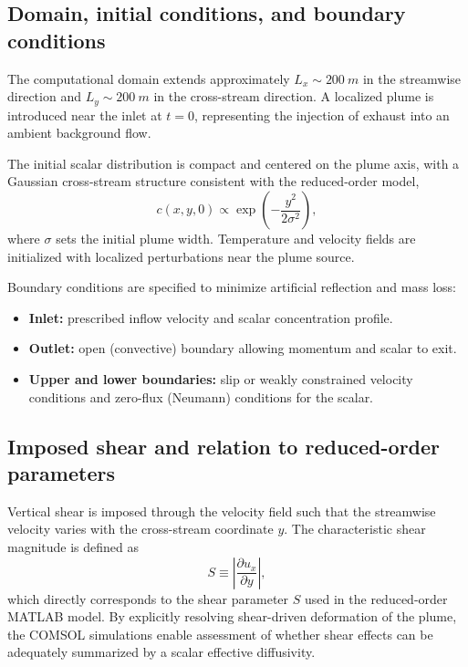 \documentclass[11pt]{article}
\begin{document}
\subsection{Domain, initial conditions, and boundary conditions}
\label{sec:comsol_domain}

The computational domain extends approximately $L_x \sim \SI{200}{m}$ in the streamwise
direction and $L_y \sim \SI{200}{m}$ in the cross-stream direction. A localized plume is
introduced near the inlet at $t=0$, representing the injection of exhaust into an ambient
background flow.

The initial scalar distribution is compact and centered on the plume axis, with a
Gaussian cross-stream structure consistent with the reduced-order model,
\begin{equation}
c(x,y,0) \propto \exp\!\left(-\frac{y^2}{2\sigma^2}\right),
\label{eq:comsol_ic}
\end{equation}
where $\sigma$ sets the initial plume width. Temperature and velocity fields are
initialized with localized perturbations near the plume source.

Boundary conditions are specified to minimize artificial reflection and mass loss:
\begin{itemize}
\item \textbf{Inlet:} prescribed inflow velocity and scalar concentration profile.
\item \textbf{Outlet:} open (convective) boundary allowing momentum and scalar to exit.
\item \textbf{Upper and lower boundaries:} slip or weakly constrained velocity conditions
and zero-flux (Neumann) conditions for the scalar.
\end{itemize}

\subsection{Imposed shear and relation to reduced-order parameters}
\label{sec:comsol_shear}

Vertical shear is imposed through the velocity field such that the streamwise velocity
varies with the cross-stream coordinate $y$. The characteristic shear magnitude is
defined as
\begin{equation}
S \equiv \left|\frac{\partial u_x}{\partial y}\right|,
\label{eq:comsol_shear}
\end{equation}
which directly corresponds to the shear parameter $S$ used in the reduced-order MATLAB
model. By explicitly resolving shear-driven deformation of the plume, the COMSOL
simulations enable assessment of whether shear effects can be adequately summarized by a
scalar effective diffusivity.
\end{document}
